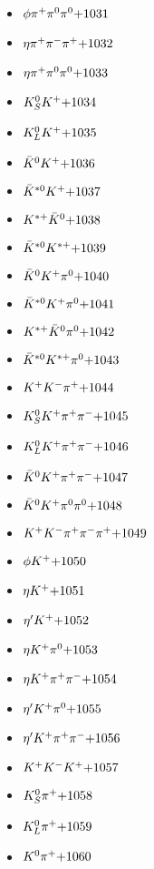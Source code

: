 \begin{multicols}{3}
\begin{itemize}
 \item $ \phi \pi^{+} \pi^{0} \pi^{0} \hfill{+1031}$
 \item $ \eta \pi^{+} \pi^{-} \pi^{+} \hfill{+1032}$
 \item $ \eta \pi^{+} \pi^{0} \pi^{0} \hfill{+1033}$
 \item $ K_{S}^{0} K^{+} \hfill{+1034}$
 \item $ K_{L}^{0} K^{+} \hfill{+1035}$
 \item $ \bar{K}^{0} K^{+} \hfill{+1036}$
 \item $ \bar{K}^{*0} K^{+} \hfill{+1037}$
 \item $ K^{*+} \bar{K}^{0} \hfill{+1038}$
 \item $ \bar{K}^{*0} K^{*+} \hfill{+1039}$
 \item $ \bar{K}^{0} K^{+} \pi^{0} \hfill{+1040}$
 \item $ \bar{K}^{*0} K^{+} \pi^{0} \hfill{+1041}$
 \item $ K^{*+} \bar{K}^{0} \pi^{0} \hfill{+1042}$
 \item $ \bar{K}^{*0} K^{*+} \pi^{0} \hfill{+1043}$
 \item $ K^{+} K^{-} \pi^{+} \hfill{+1044}$
 \item $ K_{S}^{0} K^{+} \pi^{+} \pi^{-} \hfill{+1045}$
 \item $ K_{L}^{0} K^{+} \pi^{+} \pi^{-} \hfill{+1046}$
 \item $ \bar{K}^{0} K^{+} \pi^{+} \pi^{-} \hfill{+1047}$
 \item $ \bar{K}^{0} K^{+} \pi^{0} \pi^{0} \hfill{+1048}$
 \item $ K^{+} K^{-} \pi^{+} \pi^{-} \pi^{+} \hfill{+1049}$
 \item $ \phi K^{+} \hfill{+1050}$
 \item $ \eta K^{+} \hfill{+1051}$
 \item $ {\eta^{\prime}} K^{+} \hfill{+1052}$
 \item $ \eta K^{+} \pi^{0} \hfill{+1053}$
 \item $ \eta K^{+} \pi^{+} \pi^{-} \hfill{+1054}$
 \item $ {\eta^{\prime}} K^{+} \pi^{0} \hfill{+1055}$
 \item $ {\eta^{\prime}} K^{+} \pi^{+} \pi^{-} \hfill{+1056}$
 \item $ K^{+} K^{-} K^{+} \hfill{+1057}$
 \item $ K_{S}^{0} \pi^{+} \hfill{+1058}$
 \item $ K_{L}^{0} \pi^{+} \hfill{+1059}$
 \item $ K^{0} \pi^{+} \hfill{+1060}$

\end{itemize}
\end{multicols}
